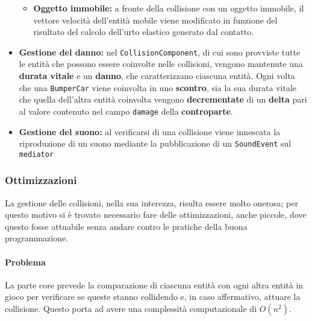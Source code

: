 \begin{itemize}
\begin{itemize}
            \item \textbf{Oggetto immobile:} a fronte della collisione con un oggetto immobile, il vettore velocità dell'entità mobile viene modificato in funzione del risultato del calcolo dell'urto elastico generato dal contatto. 
        \end{itemize}
    \item \textbf{Gestione del danno:} nel \texttt{CollisionComponent}, di cui sono provviste tutte le entità che possono essere coinvolte nelle collisioni, vengono mantenute una \textbf{durata vitale} e un \textbf{danno}, che caratterizzano ciascuna entità.
    Ogni volta che una \texttt{BumperCar} viene coinvolta in uno \textbf{scontro}, sia la sua durata vitale che quella dell'altra entità coinvolta vengono \textbf{decrementate} di un \textbf{delta} pari al valore contenuto nel campo \texttt{damage} della \textbf{controparte}.
     \item \textbf{Gestione del suono:} al verificarsi di una collisione viene innescata la riproduzione di un suono mediante la pubblicazione di un \texttt{SoundEvent} sul \texttt{mediator}
\end{itemize}  

\subsubsection{Ottimizzazioni}  
La gestione delle collisioni, nella sua interezza, risulta essere molto onerosa; per questo motivo si è trovato necessario fare delle ottimizzazioni, anche piccole, dove questo fosse attuabile senza andare contro le pratiche della buona programmazione.
\paragraph{Problema}
 La parte core prevede la comparazione di ciascuna entità con ogni altra entità in gioco per verificare se queste stanno collidendo e, in caso affermativo, attuare la collisione. Questo porta ad avere una complessità computazionale di $O({n}^2)$.
